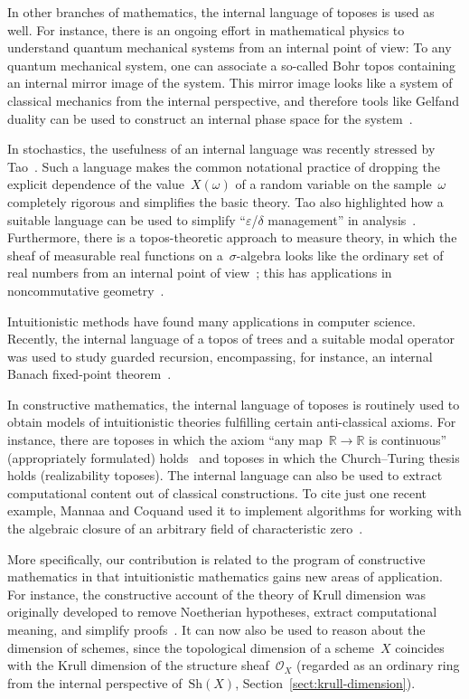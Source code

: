 \documentclass[10pt]{amsart}
\theoremstyle{definition}
\theoremstyle{plain}
\theoremstyle{remark}
\renewcommand{\O}{\mathcal{O}}
\newcommand{\RR}{\mathbb{R}}
\newcommand{\Sh}{\mathrm{Sh}}
\newcommand{\?}{\,{:}\,}
\renewcommand{\_}{\mathpunct{.}\,}
\begin{document}
In other branches of mathematics, the internal language of toposes is used as well. For
instance, there is an ongoing effort in mathematical physics to understand
quantum mechanical systems from an internal point of view: To any quantum
mechanical system, one can associate a so-called Bohr topos containing an
internal mirror image of the system. This mirror image looks like a
system of classical mechanics from the internal perspective, and therefore
tools like Gelfand duality can be used to construct an internal
phase space for the system~\cite{bohr1,bohr2}.

In stochastics, the usefulness of an internal language was recently stressed by
Tao~\cite{tao:analysis-rel-measure-space}. Such a language makes the
common notational practice of dropping the explicit dependence of the
value~$X(\omega)$ of a random variable on the sample~$\omega$ completely
rigorous and simplifies the basic theory. Tao also highlighted how a suitable
language can be used to simplify ``$\varepsilon$/$\delta$ management'' in
analysis~\cite{tao:cheap-nsa}. Furthermore, there is a topos-theoretic approach to
measure theory, in which the sheaf of measurable real functions on
a~$\sigma$-algebra looks like the ordinary set of real numbers from an internal point
of view~\cite{jackson:sheaf-theoretic-measure-theory}; this has applications in
noncommutative geometry~\cite{henry:measure-theory-boolean-toposes}.

Intuitionistic methods have found many applications in computer science.
Recently, the internal language of a topos of trees and a suitable modal
operator was used to study guarded recursion, encompassing, for instance, an
internal Banach fixed-point theorem~\cite{birkedal:al:sgdt}.

In constructive mathematics, the internal language of toposes is routinely used
to obtain models of intuitionistic theories fulfilling certain anti-classical
axioms. For instance, there are toposes in which the axiom ``any map~$\RR \to
\RR$ is continuous'' (appropriately formulated) holds~\cite{kock:sdg,moerdijk:reyes:models}
and toposes in which the Church--Turing thesis holds (realizability toposes).
The internal language can also be used to extract computational content
out of classical constructions. To cite just one recent example, Mannaa and
Coquand used it to implement algorithms for working with the algebraic closure
of an arbitrary field of characteristic zero~\cite{mannaa:coquand:alg-closure}.

More specifically, our contribution is related to the program of constructive
mathematics in that intuitionistic mathematics gains new areas of application.
For instance, the constructive account of the theory of Krull dimension was
originally developed to remove Noetherian hypotheses, extract computational meaning, and
simplify proofs~\cite{dyn:krull-integral,dyn:char-krull}. It can now also be used to
reason about the dimension of schemes, since the topological dimension of a
scheme~$X$ coincides with the Krull dimension of the structure sheaf~$\O_X$
(regarded as an ordinary ring from the internal perspective of~$\Sh(X)$,
Section~\ref{sect:krull-dimension}).
\end{document}

